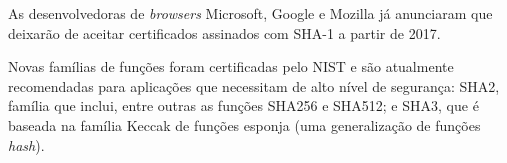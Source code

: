 As desenvolvedoras de \emph{browsers} Microsoft, Google e Mozilla já anunciaram que deixarão de aceitar certificados assinados com SHA-1 a partir de 2017.

Novas famílias de funções foram certificadas pelo NIST e são atualmente recomendadas para aplicações que necessitam de alto nível de segurança: SHA2, família que inclui, entre outras as funções SHA256 e SHA512; e SHA3, que é baseada na família Keccak de funções esponja (uma generalização de funções \emph{hash}).